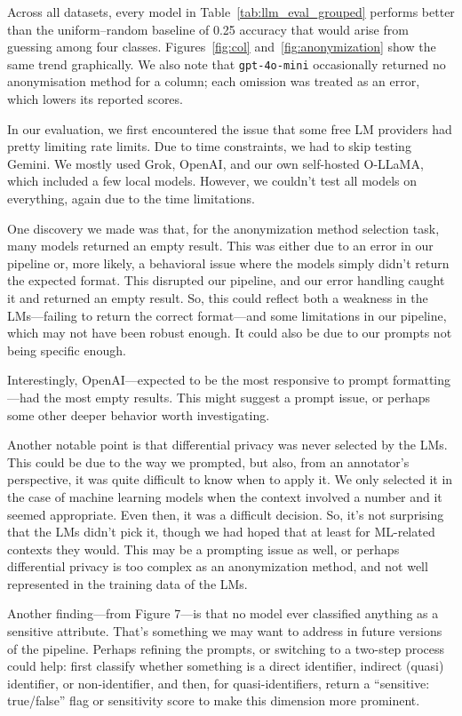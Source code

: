 \documentclass{article}
\begin{document}
Across all datasets, every model in Table~\ref{tab:llm_eval_grouped} performs better than the uniform–random baseline of 0.25 accuracy that would arise from guessing among four classes.  Figures~\ref{fig:col} and~\ref{fig:anonymization} show the same trend graphically.  We also note that \texttt{gpt-4o-mini} occasionally returned no anonymisation method for a column; each omission was treated as an error, which lowers its reported scores.


In our evaluation, we first encountered the issue that some free LM providers had pretty limiting rate limits. Due to time constraints, we had to skip testing Gemini. We mostly used Grok, OpenAI, and our own self-hosted O-LLaMA, which included a few local models. However, we couldn’t test all models on everything, again due to the time limitations.

One discovery we made was that, for the anonymization method selection task, many models returned an empty result. This was either due to an error in our pipeline or, more likely, a behavioral issue where the models simply didn’t return the expected format. This disrupted our pipeline, and our error handling caught it and returned an empty result. So, this could reflect both a weakness in the LMs—failing to return the correct format—and some limitations in our pipeline, which may not have been robust enough. It could also be due to our prompts not being specific enough.

Interestingly, OpenAI—expected to be the most responsive to prompt formatting—had the most empty results. This might suggest a prompt issue, or perhaps some other deeper behavior worth investigating.

Another notable point is that differential privacy was never selected by the LMs. This could be due to the way we prompted, but also, from an annotator’s perspective, it was quite difficult to know when to apply it. We only selected it in the case of machine learning models when the context involved a number and it seemed appropriate. Even then, it was a difficult decision. So, it's not surprising that the LMs didn’t pick it, though we had hoped that at least for ML-related contexts they would. This may be a prompting issue as well, or perhaps differential privacy is too complex as an anonymization method, and not well represented in the training data of the LMs.

Another finding—from Figure 7—is that no model ever classified anything as a sensitive attribute. That’s something we may want to address in future versions of the pipeline. Perhaps refining the prompts, or switching to a two-step process could help: first classify whether something is a direct identifier, indirect (quasi) identifier, or non-identifier, and then, for quasi-identifiers, return a “sensitive: true/false” flag or sensitivity score to make this dimension more prominent.
\end{document}
